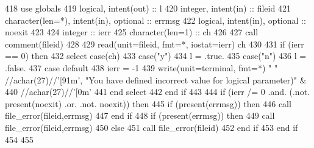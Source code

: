 \begin{DoxyCode}
418       \textcolor{keywordtype}{use }globals
419       \textcolor{keywordtype}{logical}, \textcolor{keywordtype}{intent(out)} :: l
420       \textcolor{keywordtype}{integer}, \textcolor{keywordtype}{intent(in)} :: fileid
421       \textcolor{keywordtype}{character(len=*)}, \textcolor{keywordtype}{intent(in)}, \textcolor{keywordtype}{optional} :: errmsg
422       \textcolor{keywordtype}{logical}, \textcolor{keywordtype}{intent(in)}, \textcolor{keywordtype}{optional} :: noexit
423 
424       \textcolor{keywordtype}{integer} :: ierr
425       \textcolor{keywordtype}{character(len=1)} :: ch
426       
427       \textcolor{keyword}{call }comment(fileid)
428       
429       \textcolor{keyword}{read}(unit=fileid, fmt=*, iostat=ierr) ch
430 
431       \textcolor{keywordflow}{if} (ierr == 0) \textcolor{keywordflow}{then} 
432         \textcolor{keywordflow}{select case}(ch)
433           \textcolor{keywordflow}{case}(\textcolor{stringliteral}{"y"})
434             l = .true.
435           \textcolor{keywordflow}{case}(\textcolor{stringliteral}{"n"})
436             l = .false.
437 \textcolor{keywordflow}{          case default}
438             ierr = -1
439             \textcolor{keyword}{write}(unit=terminal, fmt=*) \textcolor{stringliteral}{" "} //achar(27)//\textcolor{stringliteral}{'[91m'}, \textcolor{stringliteral}{"You have defined incorrect value for
       logical parameter)"}\textcolor{comment}{ &}
440 \textcolor{comment}{             //achar(27)//}\textcolor{stringliteral}{'[0m'}
441 \textcolor{keywordflow}{         end select}
442 \textcolor{keywordflow}{       end if}
443       
444       \textcolor{keywordflow}{if} (ierr /= 0 .and. (.not. \textcolor{keyword}{present}(noexit) .or. .not. noexit)) \textcolor{keywordflow}{then}
445         \textcolor{keywordflow}{if} (\textcolor{keyword}{present}(errmsg)) \textcolor{keywordflow}{then}
446           \textcolor{keyword}{call }file_error(fileid,errmsg)
447 \textcolor{keywordflow}{        end if}
448         \textcolor{keywordflow}{if} (\textcolor{keyword}{present}(errmsg)) \textcolor{keywordflow}{then}
449           \textcolor{keyword}{call }file_error(fileid,errmsg)
450         \textcolor{keywordflow}{else}
451           \textcolor{keyword}{call }file_error(fileid)
452 \textcolor{keywordflow}{        end if}
453 \textcolor{keywordflow}{      end if}
454       
455       
\end{DoxyCode}
